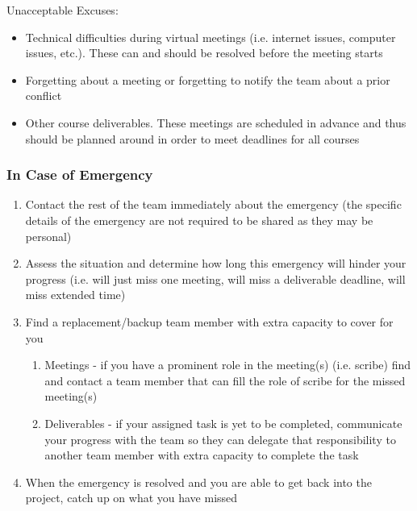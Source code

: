 \documentclass{article}
\begin{document}
\noindent Unacceptable Excuses:

\begin{itemize}
    \item Technical difficulties during virtual meetings (i.e. internet issues, 
    computer issues, etc.). These can and should be resolved before the meeting 
    starts
    \item Forgetting about a meeting or forgetting to notify the team about 
    a prior conflict
    \item Other course deliverables. These meetings are scheduled in advance and 
    thus should be planned around in order to meet deadlines for all courses
\end{itemize}


\subsubsection*{In Case of Emergency}

\begin{enumerate}
  \item Contact the rest of the team immediately about the emergency (the specific details 
  of the emergency are not required to be shared as they may be personal)
  \item Assess the situation and determine how long this emergency will hinder your 
  progress (i.e. will just miss one meeting, will miss a deliverable deadline, 
  will miss extended time)
  \item Find a replacement/backup team member with extra capacity to cover for you 
  \begin{enumerate}
    \item Meetings - if you have a prominent role in the meeting(s) (i.e. scribe) 
    find and contact a team member that can fill the role of scribe for the missed 
    meeting(s)
    \item Deliverables - if your assigned task is yet to be completed, communicate 
    your progress with the team so they can delegate that responsibility to another 
    team member with extra capacity to complete the task
  \end{enumerate}
  \item When the emergency is resolved and you are able to get back into the project,
  catch up on what you have missed
\end{enumerate}
\end{document}
